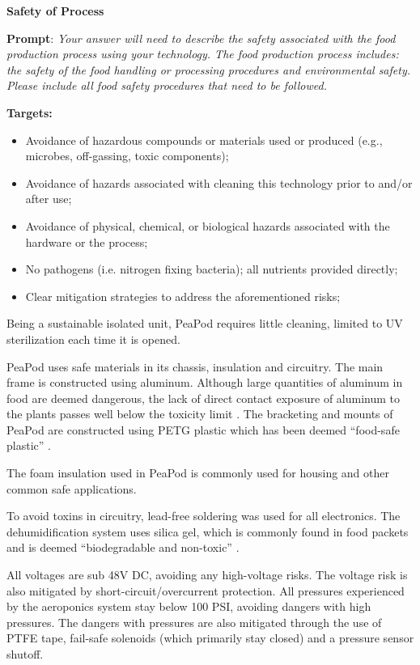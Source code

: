 \documentclass{report}
\begin{document}
\textbf{Safety of Process}
\label{sec:safety-process}

\textbf{Prompt}: \textit{Your answer will need to describe the safety associated with the food production process using your technology. The food production process includes: the safety of the food handling or processing procedures and environmental safety. Please include all food safety procedures that need to be followed.}

\textbf{Targets:}
\begin{itemize}
    \item Avoidance of hazardous compounds or materials used or produced (e.g., microbes, off-gassing, toxic components);
    \item Avoidance of hazards associated with cleaning this technology prior to and/or after use;
    \item Avoidance of physical, chemical, or biological hazards associated with the hardware or the process;
    \item No pathogens (i.e. nitrogen fixing bacteria); all nutrients provided directly;
    \item Clear mitigation strategies to address the aforementioned risks;
\end{itemize}


Being a sustainable isolated unit, PeaPod requires little cleaning, limited to UV sterilization each time it is opened.

PeaPod uses safe materials in its chassis, insulation and circuitry. 
The main frame is constructed using aluminum. Although large quantities of aluminum in food are deemed dangerous, the lack of direct contact exposure of aluminum to the plants passes well below the toxicity limit \cite{aluminum}.
The bracketing and mounts of PeaPod are constructed using PETG plastic which has been deemed “food-safe plastic” \cite{petg}.

The foam insulation used in PeaPod is commonly used for housing and other common safe applications. 

To avoid toxins in circuitry, lead-free soldering was used for all electronics. The dehumidification system uses silica gel, which is commonly found in food packets and is deemed “biodegradable and non-toxic” \cite{silica}.

All voltages are sub 48V DC, avoiding any high-voltage risks. The voltage risk is also mitigated by short-circuit/overcurrent protection. 
All pressures experienced by the aeroponics system stay below 100 PSI, avoiding dangers with high pressures. The dangers with pressures are also mitigated through the use of PTFE tape, fail-safe solenoids (which primarily stay closed) and a pressure sensor shutoff. 
\end{document}
